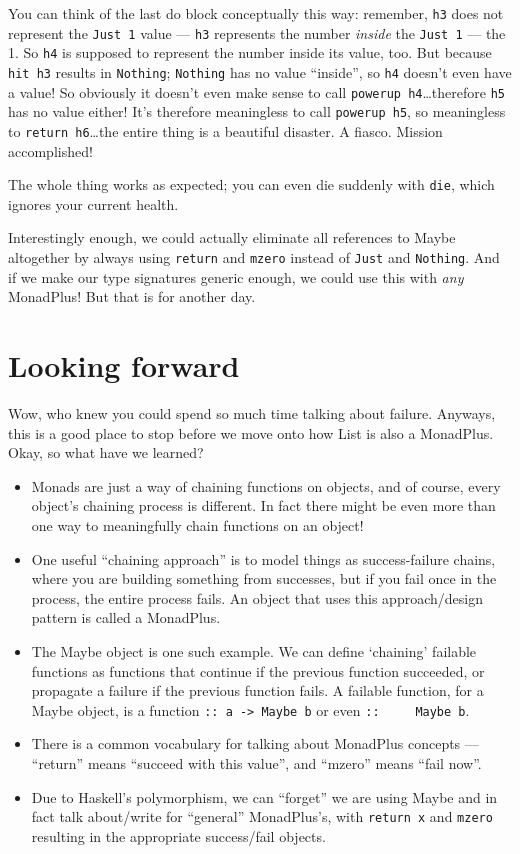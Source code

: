 \documentclass[]{article}
\begin{document}
You can think of the last do block conceptually this way: remember, \texttt{h3}
does not represent the \texttt{Just\ 1} value --- \texttt{h3} represents the
number \emph{inside} the \texttt{Just\ 1} --- the 1. So \texttt{h4} is supposed
to represent the number inside its value, too. But because \texttt{hit\ h3}
results in \texttt{Nothing}; \texttt{Nothing} has no value ``inside'', so
\texttt{h4} doesn't even have a value! So obviously it doesn't even make sense
to call \texttt{powerup\ h4}\ldots therefore \texttt{h5} has no value either!
It's therefore meaningless to call \texttt{powerup\ h5}, so meaningless to
\texttt{return\ h6}\ldots the entire thing is a beautiful disaster. A fiasco.
Mission accomplished!

The whole thing works as expected; you can even die suddenly with \texttt{die},
which ignores your current health.

Interestingly enough, we could actually eliminate all references to Maybe
altogether by always using \texttt{return} and \texttt{mzero} instead of
\texttt{Just} and \texttt{Nothing}. And if we make our type signatures generic
enough, we could use this with \emph{any} MonadPlus! But that is for another
day.

\section{Looking forward}\label{looking-forward}

Wow, who knew you could spend so much time talking about failure. Anyways, this
is a good place to stop before we move onto how List is also a MonadPlus. Okay,
so what have we learned?

\begin{itemize}
\tightlist
\item
  Monads are just a way of chaining functions on objects, and of course, every
  object's chaining process is different. In fact there might be even more than
  one way to meaningfully chain functions on an object!
\item
  One useful ``chaining approach'' is to model things as success-failure chains,
  where you are building something from successes, but if you fail once in the
  process, the entire process fails. An object that uses this approach/design
  pattern is called a MonadPlus.
\item
  The Maybe object is one such example. We can define `chaining' failable
  functions as functions that continue if the previous function succeeded, or
  propagate a failure if the previous function fails. A failable function, for a
  Maybe object, is a function \texttt{::\ a\ -\textgreater{}\ Maybe\ b} or even
  \texttt{::\ \ \ \ \ Maybe\ b}.
\item
  There is a common vocabulary for talking about MonadPlus concepts ---
  ``return'' means ``succeed with this value'', and ``mzero'' means ``fail
  now''.
\item
  Due to Haskell's polymorphism, we can ``forget'' we are using Maybe and in
  fact talk about/write for ``general'' MonadPlus's, with \texttt{return\ x} and
  \texttt{mzero} resulting in the appropriate success/fail objects.
\end{itemize}
\end{document}
